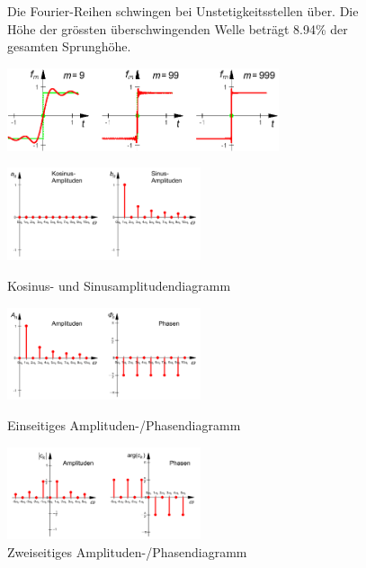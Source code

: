 

\begin{figure}[htbp]
	\begin{minipage}[c]{8cm}
		Die Fourier-Reihen schwingen bei Unstetigkeitsstellen über. Die Höhe der grössten überschwingenden Welle
		beträgt 8.94\% der gesamten Sprunghöhe.
	\end{minipage}
	\begin{minipage}[c]{8cm}
		\includegraphics[width=8cm]{./bilder/gibssches_phaenomen.png}  
	\end{minipage}
\end{figure}


\newpage
{}

\begin{figure}[htbp]
	\centering
	\begin{minipage}[b]{5.7cm}
		\includegraphics[width=5.7cm]{./bilder/spektren_cossin.png}
		\caption{Kosinus- und Sinusamplitudendiagramm} 
	\end{minipage}
	\hspace{0.5cm}
	\begin{minipage}[b]{5.7cm}
		\includegraphics[width=5.7cm]{./bilder/spektren_einseitig.png} 
		\caption{Einseitiges Amplituden-/Phasendiagramm} 
	\end{minipage}
	\hspace{0.5cm}
	\begin{minipage}[b]{5.7cm}
		\includegraphics[width=5.7cm]{./bilder/spektren_zweiseitig.png} 
		\caption{Zweiseitiges Amplituden-/Phasendiagramm} 
	\end{minipage}
\end{figure}

